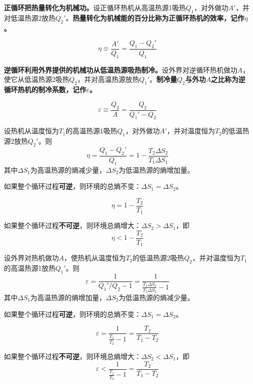 \documentclass[CJK]{beamer}
\begin{document}
\begin{frame}
\bch
{\bf 正循环把热量转化为机械功。}设正循环热机从高温热源1吸热$Q_1$，对外做功$A'$，并对低温热源2放热$Q_2'$。{\bf 热量转化为机械能的百分比称为正循环热机的效率，记作$\eta$。}

$$\eta \equiv \frac{A'}{Q_1}=\frac{Q_1-Q_2'}{Q_1} $$


\ech
\end{frame}


\begin{frame}
\bch
{\bf 逆循环利用外界提供的机械功从低温热源吸热制冷。}设外界对逆循环热机做功$A$，使它从低温热源2吸热$Q_2$，并对高温热源放热$Q_1'$。{\bf 制冷量$Q_2$与外功$A$之比称为逆循环热机的制冷系数，记作$\varepsilon$。}

$$\varepsilon \equiv \frac{Q_2}{A}=\frac{Q_2}{Q_1'-Q_2} $$

\ech
\end{frame}

\begin{frame}
\bch

设热机从温度恒为$T_1$的高温热源1吸热$Q_1$，对外做功$A'$，并对温度恒为$T_2$的低温热源2放热$Q_2'$。则
$$\eta = \frac{Q_1-Q_2'}{Q_1} = 1-\frac{T_2\Delta S_2}{T_1\Delta S_1}$$
其中$\Delta S_1$为高温热源的熵减少量，$\Delta S_2$为低温热源的熵增加量。

如果整个循环过程{\bf 可逆}，则环境的总熵不变：$\Delta S_1 = \Delta S_2$。

$$ \eta = 1 - \frac{T_2}{T_1}$$

如果整个循环过程{\bf 不可逆}，则环境总熵增大：$\Delta S_2 > \Delta S_1$，即
$$\eta < 1 - \frac{T_2}{T_1} $$


\ech
\end{frame}


\begin{frame}
\bch

设外界对热机做功$A$，使热机从温度恒为$T_2$的低温热源2吸热$Q_2$，并对温度恒为$T_1$的高温热源1放热$Q_1'$。则
$$\varepsilon = \frac{1}{Q_1'/Q_2 - 1} = \frac{1}{\frac{T_1\Delta S_1}{T_2\Delta S_2}-1}$$
其中$\Delta S_1$为高温热源的熵增加量，$\Delta S_2$为低温热源的熵减少量。

如果整个循环过程{\bf 可逆}，则环境的总熵不变：$\Delta S_1 = \Delta S_2$。

$$ \varepsilon = \frac{1}{\frac{T_1}{T_2}-1}=\frac{T_2}{T_1-T_2}$$

如果整个循环过程{\bf 不可逆}，则环境总熵增大：$\Delta S_2 < \Delta S_1$，即
$$\varepsilon < \frac{1}{\frac{T_1}{T_2}-1} = \frac{T_2}{T_1-T_2} $$


\ech
\end{frame}
\end{document}
